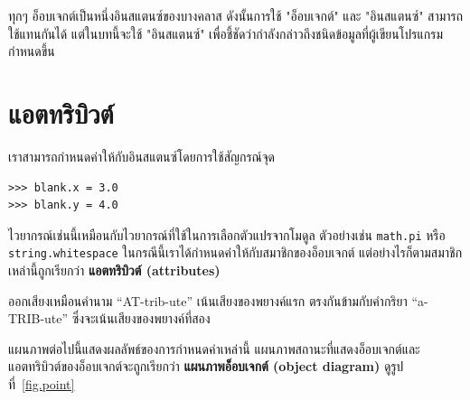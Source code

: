 
ทุกๆ อ็อบเจกต์เป็นหนึ่งอินสแตนซ์ของบางคลาส ดังนั้นการใช้ "อ็อบเจกต์" และ "อินสแตนซ์" สามารถใช้แทนกันได้ แต่ในบทนี้จะใช้ "อินสแตนซ์" เพื่อชี้ชัดว่ากำลังกล่าวถึงชนิดข้อมูลที่ผู้เขียนโปรแกรมกำหนดขึ้น

\section{แอตทริบิวต์ } %
\label{attributes}

เราสามารถกำหนดค่าให้กับอินสแตนซ์โดยการใช้สัญกรณ์จุด

\begin{verbatim}
>>> blank.x = 3.0
>>> blank.y = 4.0
\end{verbatim}
%

ไวยากรณ์เช่นนี้เหมือนกับไวยากรณ์ที่ใช้ในการเลือกตัวแปรจากโมดูล ตัวอย่างเช่น {\tt math.pi} หรือ {\tt string.whitespace}
ในกรณีนี้เราได้กำหนดค่าให้กับสมาชิกของอ็อบเจกต์ แต่อย่างไรก็ตามสมาชิกเหล่านี้ถูกเรียกว่า {\bf แอตทริบิวต์ (attributes)} 



ออกเสียงเหมือนคำนาม ``AT-trib-ute'' เน้นเสียงของพยางค์แรก ตรงกันข้ามกับคำกริยา ``a-TRIB-ute'' ซึ่งจะเน้นเสียงของพยางค์ที่สอง


แผนภาพต่อไปนี้แสดงผลลัพธ์ของการกำหนดค่าเหล่านี้  แผนภาพสถานะที่แสดงอ็อบเจกต์และแอตทริบิวต์ของอ็อบเจกต์จะถูกเรียกว่า {\bf แผนภาพอ็อบเจกต์ (object diagram)}
ดูรูปที่~\ref{fig.point}


